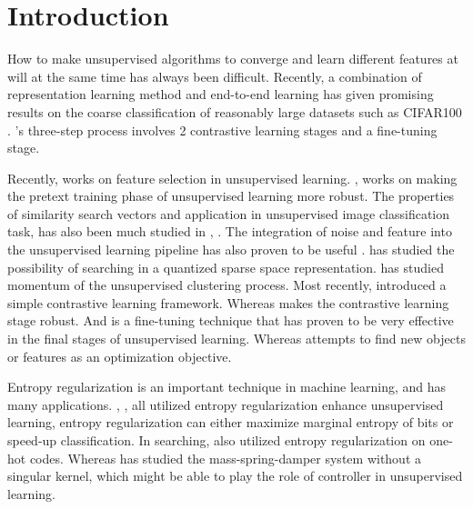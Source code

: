 \documentclass[10pt,twocolumn,letterpaper]{article}
\begin{document}
%
\IEEEpeerreviewmaketitle



\section{Introduction}

How to make unsupervised algorithms to converge and learn different features at will at the same time has always been difficult. Recently, a combination of representation learning method and end-to-end learning  has given promising results on the coarse classification of reasonably large datasets such as CIFAR100 \cite{wvangansbeke2020scan}. \cite{wvangansbeke2020scan}'s three-step process involves 2 contrastive learning stages  and a fine-tuning stage.  

Recently, \cite{JunGuo_AAAI_2020} works on feature selection in unsupervised learning. \cite{pretextInvariant2020}, \cite{pretrain2019Uncurated} works on making the pretext training phase of unsupervised learning more robust. 
The properties of similarity search vectors and application in unsupervised image classification task, has also been much studied in  \cite{alex2018spreading}, \cite{spreadLocal2019} . The integration of noise and feature into the unsupervised learning pipeline has also proven to be useful \cite{bojanowski2017unsupervised}. \cite{jain2016approximate} \cite{Zhang2015SparseCQ} has studied the possibility of searching in a quantized sparse space representation. \cite{he2019momentum} has studied momentum of the unsupervised clustering process. Most recently, \cite{chen2020simple} introduced a simple contrastive learning framework. Whereas \cite{chuang2020debiased} makes the contrastive learning stage robust. And \cite{asano2020self} is a fine-tuning technique that has proven to be very effective in the final stages of unsupervised learning. Whereas \cite{vo2019unsupervised} attempts to find new objects or features as an optimization objective. 

Entropy regularization is an important technique in machine learning, and has many applications. \cite{pereyra2017regularizing}, \cite{cuturi2013sinkhorn}, \cite{Liong2015DeepHF} all utilized entropy regularization enhance unsupervised learning, entropy regularization can either maximize marginal entropy of bits or speed-up classification. In searching, \cite{subic2017} also utilized entropy regularization on one-hot codes.  Whereas \cite{entropy2015Spring} has studied the mass-spring-damper system without a singular kernel, which might be able to play the role of controller in unsupervised learning. 
\end{document}
